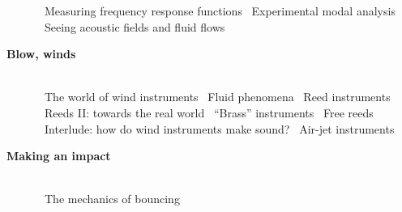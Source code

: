 \begin{description}
\quad{\gre{}\pageref{s:4ff8f074}}~Measuring frequency response functions
\quad{\gre{}\pageref{s:cdd6169a}}~Experimental modal analysis
\quad{\gre{}\pageref{s:835a5127}}~Seeing acoustic fields and fluid flows
\item[\hspace{-1cm}\pageref{s:9282ee20}\hspace{+0cm} \large\bf\sf \blu Blow, winds]\hfill \\ 
\quad{\gre{}\pageref{s:052b8c63}}~The world of wind instruments
\quad{\gre{}\pageref{s:640e2fb8}}~Fluid phenomena
\quad{\gre{}\pageref{s:64819e9d}}~Reed instruments
\quad{\gre{}\pageref{s:22e4c5c8}}~Reeds II: towards the real world
\quad{\gre{}\pageref{s:cb7d9f7c}}~``Brass'' instruments
\quad{\gre{}\pageref{s:6c2b0661}}~Free reeds
\quad{\gre{}\pageref{s:58f855f7}}~Interlude: how do wind instruments  make sound?
\quad{\gre{}\pageref{s:ede5032a}}~Air-jet instruments
\item[\hspace{-1cm}\pageref{s:81fc3d3e}\hspace{+0cm} \large\bf\sf \blu Making an impact]\hfill \\ 
\quad{\gre{}\pageref{s:5be23a02}}~The mechanics of bouncing\end{description}